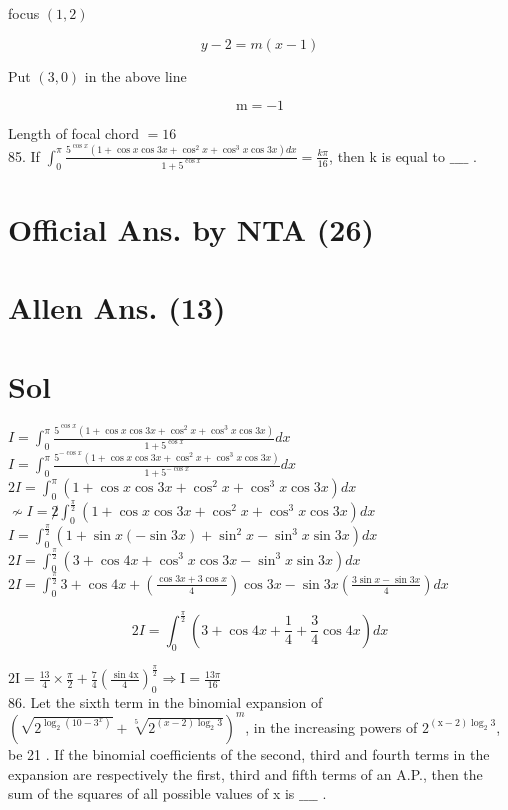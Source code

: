 \documentclass[10pt]{article}
\begin{document}
focus \((1,2)\)

\[
y-2=m(x-1)
\]

Put \((3,0)\) in the above line

\[
\mathrm{m}=-1
\]

Length of focal chord \(=16\)\\
85. If \(\int_{0}^{\pi} \frac{5^{\cos x}\left(1+\cos x \cos 3 x+\cos ^{2} x+\cos ^{3} x \cos 3 x\right) d x}{1+5^{\cos x}}=\frac{k \pi}{16}\), then k is equal to \(\_\_\_\_\) .

\section*{Official Ans. by NTA (26)}
\section*{Allen Ans. (13)}
\section*{Sol}
\(I=\int_{0}^{\pi} \frac{5^{\cos x}\left(1+\cos x \cos 3 x+\cos ^{2} x+\cos ^{3} x \cos 3 x\right)}{1+5^{\cos x}} d x\)\\
\(I=\int_{0}^{\pi} \frac{5^{-\cos x}\left(1+\cos x \cos 3 x+\cos ^{2} x+\cos ^{3} x \cos 3 x\right)}{1+5^{-\cos x}} d x\)\\
\(2 I=\int_{0}^{\pi}\left(1+\cos x \cos 3 x+\cos ^{2} x+\cos ^{3} x \cos 3 x\right) d x\)\\
\(\nsim I=\not 2 \int_{0}^{\frac{\pi}{2}}\left(1+\cos x \cos 3 x+\cos ^{2} x+\cos ^{3} x \cos 3 x\right) d x\)\\
\(I=\int_{0}^{\frac{\pi}{2}}\left(1+\sin x(-\sin 3 x)+\sin ^{2} x-\sin ^{3} x \sin 3 x\right) d x\)\\
\(2 I=\int_{0}^{\frac{\pi}{2}}\left(3+\cos 4 x+\cos ^{3} x \cos 3 x-\sin ^{3} x \sin 3 x\right) d x\)\\
\(2 I=\int_{0}^{\frac{\pi}{2}} 3+\cos 4 x+\left(\frac{\cos 3 x+3 \cos x}{4}\right) \cos 3 x-\sin 3 x\left(\frac{3 \sin x-\sin 3 x}{4}\right) d x\)

\[
2 I=\int_{0}^{\frac{\pi}{2}}\left(3+\cos 4 x+\frac{1}{4}+\frac{3}{4} \cos 4 x\right) d x
\]

\(2 \mathrm{I}=\frac{13}{4} \times \frac{\pi}{2}+\frac{7}{4}\left(\frac{\sin 4 \mathrm{x}}{4}\right)_{0}^{\frac{\pi}{2}} \Rightarrow \mathrm{I}=\frac{13 \pi}{16}\)\\
86. Let the sixth term in the binomial expansion of \(\left(\sqrt{2^{\log _{2}\left(10-3^{x}\right)}}+\sqrt[5]{2^{(x-2) \log _{2} 3}}\right)^{m}\), in the increasing powers of \(2^{(\mathrm{x}-2) \log _{2} 3}\), be 21 . If the binomial coefficients of the second, third and fourth terms in the expansion are respectively the first, third and fifth terms of an A.P., then the sum of the squares of all possible values of x is \(\_\_\_\_\) .
\end{document}
